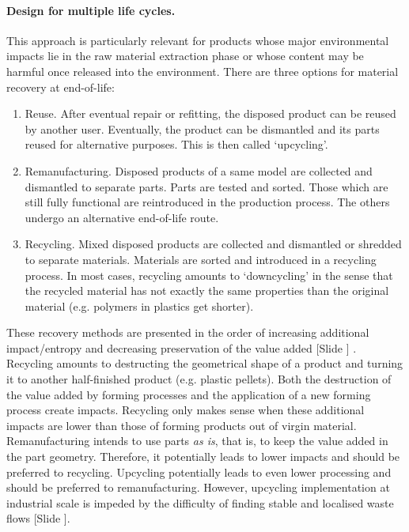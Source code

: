\documentclass{article}
\newcounter{slide}
\begin{document}
\paragraph{Design for multiple life cycles.}
\label{sec:DfR}
This approach is particularly relevant for products whose major environmental impacts lie in the raw material extraction phase or whose content may be harmful once released into the environment. There are three options for material recovery at end-of-life:
\begin{enumerate}
	\item Reuse. After eventual repair or refitting, the disposed product can be reused by another user. Eventually, the product can be dismantled and its parts reused for alternative purposes. This is then called `upcycling'. 
	\item Remanufacturing. Disposed products of a same model are collected and dismantled to separate parts. Parts are tested and sorted. Those which are still fully functional are reintroduced in the production process. The others undergo an alternative end-of-life route.
	\item Recycling. Mixed disposed products are collected and dismantled or shredded to separate materials. Materials are sorted and introduced in a recycling process. In most cases, recycling amounts to `downcycling' in the sense that the recycled material has not exactly the same properties than the original material (e.g. polymers in plastics get shorter).
\end{enumerate}
These recovery methods are presented in the order of increasing additional impact/entropy and decreasing preservation of the value added {\color{blue}[Slide ]} \cite{mihelcicSustainabilityScienceEngineering2003}. Recycling amounts to destructing the geometrical shape of a product and turning it to another half-finished product (e.g. plastic pellets). Both the destruction of the value added by forming processes and the application of a new forming process create impacts. Recycling only makes sense when these additional impacts are lower than those of forming products out of virgin material. Remanufacturing intends to use parts \emph{as is}, that is, to keep the value added in the part geometry. Therefore, it potentially leads to lower impacts and should be preferred to recycling. Upcycling potentially leads to even lower processing and should be preferred to remanufacturing. However, upcycling implementation at industrial scale is impeded by the difficulty of finding stable and localised waste flows {\color{blue}[Slide ]}.
\end{document}
